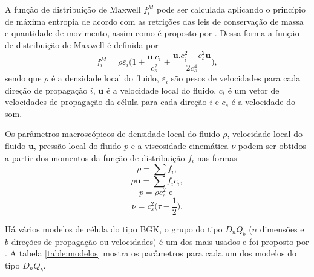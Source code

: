 A função de distribuição de Maxwell $f_{i}^{M}$ pode ser calculada aplicando o princípio de máxima entropia de acordo com as retrições das leis de conservação de massa e quantidade de movimento, assim como é proposto por . Dessa forma a função de distribuição de Maxwell é definida por
\begin{equation}
	f_{i}^{M} = \rho \varepsilon _{i}\bigg( 1 + \frac{\textbf{u}.c_{i}}{c_{s}^{2}} + \frac{\textbf{u}.c_{i}^{2} - c_{s}^{2}\textbf{u}}{2c_{s}^{4}}\bigg),
    \label{eq:f_i_M}
\end{equation}
sendo que $\rho$ é a densidade local do fluido, $\varepsilon_{i}$ são pesos de velocidades para cada direção de propagação $i$, $\textbf{u}$ é a velocidade local do fluido, $c_{i}$ é um vetor de velocidades de propagação da célula para cada direção $i$ e $c_{s}$ é a velocidade do som.

\newpage
Os parâmetros macroscópicos de densidade local do fluido $\rho$, velocidade local do fluido $\textbf{u}$, pressão local do fluido $p$ e a viscosidade cinemática $\nu$ podem ser obtidos a partir dos momentos da função de distribuição $f_{i}$ nas formas
\begin{equation}
	\rho = \sum{f_{i}},
    \label{eq:rho}
\end{equation}
\begin{equation}
	\rho \textbf{u} = \sum{f_{i} c_{i}},
    \label{eq:u}
\end{equation}
\begin{equation}
	p = \rho c^{2}_{s} \text{ e }
    \label{eq:p}
\end{equation}
\begin{equation}
	\nu = c^{2}_{s} \bigg(\tau - \frac{1}{2}\bigg).
    \label{eq:nu}
\end{equation}

Há vários modelos de célula do tipo BGK, o grupo do tipo $D_{n}Q_{b}$ ($n$ dimensões e $b$ direções de propagação ou velocidades) é um dos mais usados e foi proposto por . A tabela \ref{table:modelos} mostra os parâmetros para cada um dos modelos do tipo $D_{n}Q_{b}$.

